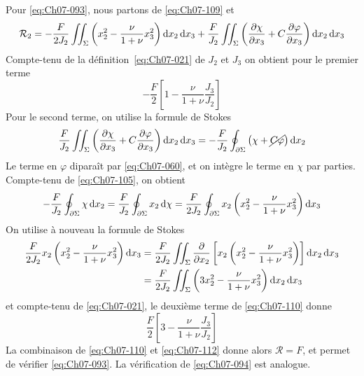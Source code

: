 Pour \eqref{eq:Ch07-093}, nous partons de \eqref{eq:Ch07-109} et 
\begin{equation}
    \mathcal{R}_2 = - \frac{F}{2 J_2} \iint_{\Sigma} \left( x_2^2 - \frac{\nu}{1+\nu} x_3^2 \right) \mathop{\mathrm{{}d}}\mathopen{} x_2 \mathop{\mathrm{{}d}}\mathopen{} x_3 + \frac{F}{J_2} \iint_{\Sigma} \left( \frac{\partial \chi}{\partial x_3} + C \frac{\partial \varphi}{\partial x_3} \right) \mathop{\mathrm{{}d}}\mathopen{} x_2 \mathop{\mathrm{{}d}}\mathopen{} x_3
    \label{eq:Ch07-110}
\end{equation}
Compte-tenu de la définition~\eqref{eq:Ch07-021} de $J_2$ et $J_3$ on obtient pour le premier terme
\begin{equation}
    -\frac{F}{2} \left[ 1 - \frac{\nu}{1+\nu} \frac{J_3}{J_2} \right]
    \label{eq:Ch07-111}
\end{equation}
Pour le second terme, on utilise la formule de Stokes
\begin{displaymath}
    \frac{F}{J_2} \iint_{\Sigma} \left( \frac{\partial \chi}{\partial x_3} + C \frac{\partial \varphi}{\partial x_3} \right) \mathop{\mathrm{{}d}}\mathopen{} x_2 \mathop{\mathrm{{}d}}\mathopen{} x_3 = -\frac{F}{J_2} \oint_{\partial \Sigma} \left( \chi + \cancel{C\varphi} \right) \mathop{\mathrm{{}d}}\mathopen{} x_2
\end{displaymath}
Le terme en $\varphi$ diparaît par \eqref{eq:Ch07-060}, et on intègre le terme en $\chi$ par parties.
Compte-tenu de \eqref{eq:Ch07-105}, on obtient
\begin{displaymath}
    -\frac{F}{J_2} \oint_{\partial \Sigma} \chi \mathop{\mathrm{{}d}}\mathopen{} x_2 = \frac{F}{J_2} \oint_{\partial \Sigma} x_2 \mathop{\mathrm{{}d}}\mathopen{} \chi = \frac{F}{2J_2} \oint_{\partial \Sigma} x_2 \left( x_2^2 - \frac{\nu}{1+\nu}x_3^2 \right) \mathop{\mathrm{{}d}}\mathopen{} x_3
\end{displaymath}
On utilise à nouveau la formule de Stokes 
\begin{align*}
    \frac{F}{2J_2} x_2 \left( x_2^2 - \frac{\nu}{1+\nu}x_3^2 \right) \mathop{\mathrm{{}d}}\mathopen{} x_3 &= \frac{F}{2J_2} \iint_{\Sigma} \frac{\partial}{\partial x_2} \left[ x_2 \left( x_2^2 - \frac{\nu}{1+\nu} x_3^2 \right) \right]\mathop{\mathrm{{}d}}\mathopen{} x_2 \mathop{\mathrm{{}d}}\mathopen{} x_3 \\
    &= \frac{F}{2J_2} \iint_{\Sigma} \left( 3x_2^2 - \frac{\nu}{1+\nu} x_3^2 \right)\mathop{\mathrm{{}d}}\mathopen{} x_2 \mathop{\mathrm{{}d}}\mathopen{} x_3
\end{align*}
et compte-tenu de \eqref{eq:Ch07-021}, le deuxième terme de \eqref{eq:Ch07-110} donne 
\begin{equation}
    \frac{F}{2} \left[ 3 - \frac{\nu}{1+\nu} \frac{J_3}{J_2} \right]
    \label{eq:Ch07-112}
\end{equation}
La combinaison de \eqref{eq:Ch07-110} et \eqref{eq:Ch07-112} donne alors $\mathcal{R}=F$, et permet de vérifier \eqref{eq:Ch07-093}.
La vérification de \eqref{eq:Ch07-094} est analogue. 
